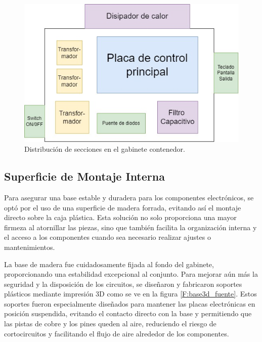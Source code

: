 \begin{figure}[H]
    \centering
    \includegraphics[scale=0.5]{./imagenes/distribucion_secciones.jpg}
    \caption{Distribución de secciones en el gabinete contenedor.}
    \label{F:distibucion_gabinete_contenedor}
\end{figure}

\subsection{Superficie de Montaje Interna}
Para asegurar una base estable y duradera para los componentes electrónicos, se optó por el uso de una superficie de madera forrada, evitando así el montaje directo sobre la caja plástica. Esta solución no solo proporciona una mayor firmeza al atornillar las piezas, sino que también facilita la organización interna y el acceso a los componentes cuando sea necesario realizar ajustes o mantenimientos.\par
La base de madera fue cuidadosamente fijada al fondo del gabinete, proporcionando una estabilidad excepcional al conjunto. Para mejorar aún más la seguridad y la disposición de los circuitos, se diseñaron y fabricaron soportes plásticos mediante impresión 3D como se ve en la figura \ref{F:base3d_fuente}. Estos soportes fueron especialmente diseñados para mantener las placas electrónicas en posición suspendida, evitando el contacto directo con la base y permitiendo que las pistas de cobre y los pines queden al aire, reduciendo el riesgo de cortocircuitos y facilitando el flujo de aire alrededor de los componentes.\par

